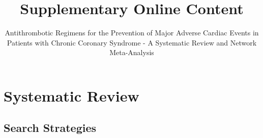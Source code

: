 \documentclass[
  12pt,
]{article}
\title{\textbf{Supplementary Online Content}}
\subtitle{Antithrombotic Regimens for the Prevention of Major Adverse
Cardiac Events in Patients with Chronic Coronary Syndrome - A Systematic
Review and Network Meta-Analysis}
\author{}
\date{\vspace{-2.5em}}
\begin{document}
\maketitle

\newpage 
\tableofcontents 
\newpage

\newpage

\hypertarget{systematic-review}{%
\section{Systematic Review}\label{systematic-review}}

\hypertarget{search-strategies}{%
\subsection{Search Strategies}\label{search-strategies}}

\begingroup\fontsize{9.3}{11.3}\selectfont
\end{document}
